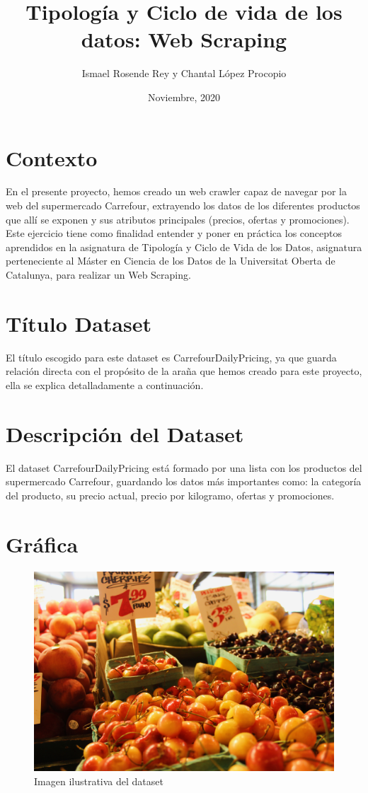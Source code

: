 \documentclass{article}
\title{Tipología y Ciclo de vida de los datos: Web Scraping}
\author{Ismael Rosende Rey y Chantal López Procopio}
\date{Noviembre, 2020}
\begin{document}
\maketitle

\section{Contexto}
En  el  presente  proyecto,  hemos creado un  web  crawler  capaz  de  navegar  por  la  web  del supermercado Carrefour, extrayendo los  datos  de los diferentes  productos que allí se exponen y sus atributos principales (precios,  ofertas  y promociones). Este ejercicio tiene como finalidad entender y poner en práctica los conceptos aprendidos  en la  asignatura  de Tipología  y  Ciclo  de  Vida  de  los  Datos, asignatura perteneciente al Máster en Ciencia de los Datos de la Universitat Oberta de Catalunya, para  realizar  un Web Scraping.

\section{Título Dataset}
El título escogido para este dataset es CarrefourDailyPricing, ya que guarda relación directa con el propósito de la araña que hemos creado para este proyecto, ella se explica detalladamente a continuación.

\section{Descripción del Dataset}
El dataset CarrefourDailyPricing está formado por una lista con los productos del supermercado Carrefour, guardando los datos más importantes como: la categoría del producto, su precio actual, precio por kilogramo, ofertas y promociones.

\section{Gráfica}

\begin{figure}[H]
    \centering
    \includegraphics[width=0.4\linewidth]{super.jpg}
    \caption{Imagen ilustrativa del dataset}
    \label{fig:dubs}
\end{figure}
\end{document}
